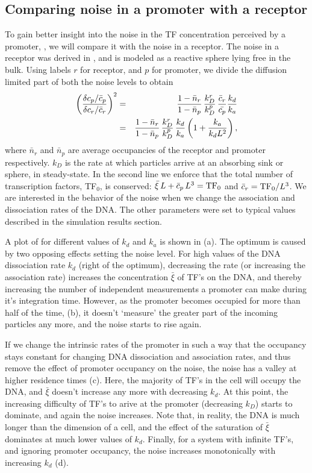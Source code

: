 \subsection{Comparing noise in a promoter with a receptor}
To gain better insight into the noise in the TF concentration perceived by a promoter, , we will compare it with the noise in a receptor. The noise in a receptor was derived in \cite{DeRonde2012}, and is modeled as a reactive sphere lying free in the bulk. Using labels $r$ for receptor, and $p$ for promoter, we divide the diffusion limited part of both the noise levels to obtain
\begin{eqnarray}
 \left( \frac{\delta c_p / \bar{c}_p}{\delta c_r / \bar{c}_r} \right)^2 & = & \frac{1-\bar{n}_r}{1-\bar{n}_p} \, \frac{k_D^r}{k_D^p} \, \frac{\bar{c}_r}{\bar{c_p}} \frac{k_d}{k_a} \\
 & = & \frac{1-\bar{n}_r}{1-\bar{n}_p} \, \frac{k_D^r}{k_D^p} \, \frac{k_d}{k_a} \left( 1 + \frac{k_a}{k_d L^2}\right),
 \elabel{NoiseCmpA}
\end{eqnarray}
where $\bar{n}_r$ and $\bar{n}_p$ are average occupancies of the receptor and promoter respectively. $k_D$ is the rate at which particles arrive at an absorbing sink or sphere, in steady-state. In the second line we enforce that the total number of transcription factors, TF$_0$, is conserved: $\bar{\xi} \, L + \bar{c}_p \, L^3 = {\rm TF}_0$ and $\bar{c}_r = {\rm TF}_0/L^3$. We are interested in the behavior of the noise when we change the association and dissociation rates of the DNA. The other parameters were set to typical values described in the simulation results section. 

A plot of  for different values of $k_d$ and $k_a$ is shown in  (a). The optimum is caused by two opposing effects setting the noise level. For high values of the DNA dissociation rate $k_d$ (right of the optimum), decreasing the rate (or increasing the association rate) increases the concentration $\bar{\xi}$ of TF's on the DNA, and thereby increasing the number of independent measurements a promoter can make during it's integration time. However, as the promoter becomes occupied for more than half of the time,  (b), it doesn't `measure' the greater part of the incoming particles any more, and the noise starts to rise again. 

If we change the intrinsic rates of the promoter in such a way that the occupancy stays constant for changing DNA dissociation and association rates, and thus remove the effect of promoter occupancy on the noise, the noise has a valley at higher residence times (c). Here, the majority of TF's in the cell will occupy the DNA, and $\bar{\xi}$ doesn't increase any more with decreasing $k_d$. At this point, the increasing difficulty of TF's to arive at the promoter (decreasing $k_D$) starts to dominate, and again the noise increases. Note that, in reality, the DNA is much longer than the dimension of a cell, and the effect of the saturation of $\bar{\xi}$ dominates at much lower values of $k_d$. Finally, for a system with infinite TF's, and ignoring promoter occupancy, the noise increases monotonically with increasing $k_d$ (d). 

